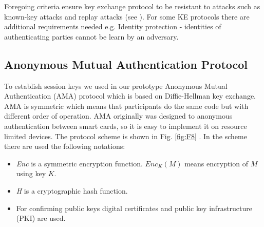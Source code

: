 \documentclass[11pt,titlepage]{article}
\theoremstyle{plain}
\begin{document}
Foregoing criteria ensure key exchange protocol to be resistant to attacks such as known-key attacks and replay attacks (see \cite{cryptography}). For some KE protocols there are additional requirements needed e.g. Identity protection - identities of authenticating parties cannot be learn by an adversary.


\subsection{Anonymous Mutual Authentication Protocol}
To establish session keys we used in our prototype Anonymous Mutual Authentication (AMA) protocol which is based on Diffie-Hellman key exchange. AMA is symmetric which means that participants do the same code but with different order of operation. AMA originally was designed to anonymous authentication between smart cards, so it is easy to implement it on resource limited devices. The protocol scheme is shown in Fig. \ref{fig:F8} \cite{AMA}. In the scheme there are used the following notations:
\begin{itemize}
	\item \textit{Enc} is a symmetric encryption function. \textit{$Enc_K(M)$} means encryption of $M$ using key $K$. 
	\item \textit{H} is a cryptographic hash function. 
	\item For confirming public keys digital certificates and public key infrastructure (PKI) are used.
\end{itemize} 
\end{document}
